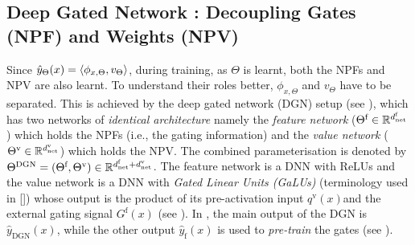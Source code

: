 \subsection{Deep Gated Network : Decoupling Gates (NPF) and Weights (NPV) }\label{sec:dgn}

Since $\hat{y}_{\Theta}(x)=\langle \phi_{x,\Theta},v_{\Theta}\rangle$, during training, as $\Theta$ is learnt, both the NPFs and NPV are also learnt. To understand their roles better, $\phi_{x,\Theta}$ and $v_{\Theta}$ have to be separated.  This is achieved by the deep gated network (DGN) setup (see ), which has two networks of \emph{identical architecture} namely the \emph{feature network} ($\Theta^{\textrm{f}}\in\mathbb{R}^{d^{\text{f}}_{\text{net}}}$) which holds the NPFs (i.e., the gating information) and the \emph{value network} (${\Theta}^{\text{v}}\in\mathbb{R}^{d^{\text{v}}_{\text{net}}}$) which holds the NPV.  The combined parameterisation is denoted by $\Theta^{\text{DGN}}=(\Theta^{\textrm{f}},{\Theta}^{\text{v}})\in \mathbb{R}^{d^{\text{f}}_{\text{net}}+d^{\text{v}}_{\text{net}}}$.  The feature network is a DNN with ReLUs and the value network is a DNN with \emph{Gated Linear Units (GaLUs)} (terminology used in []) whose output is the product of its pre-activation input $q^{\text{v}}(x)$and the external gating signal $G^{\text{f}}(x)$ (see ). In , the main output of the DGN is $\hat{y}_{\text{DGN}}(x)$, while the other output $\hat{y}_{\text{f}}(x)$ is used to \emph{pre-train} the gates (see ).

